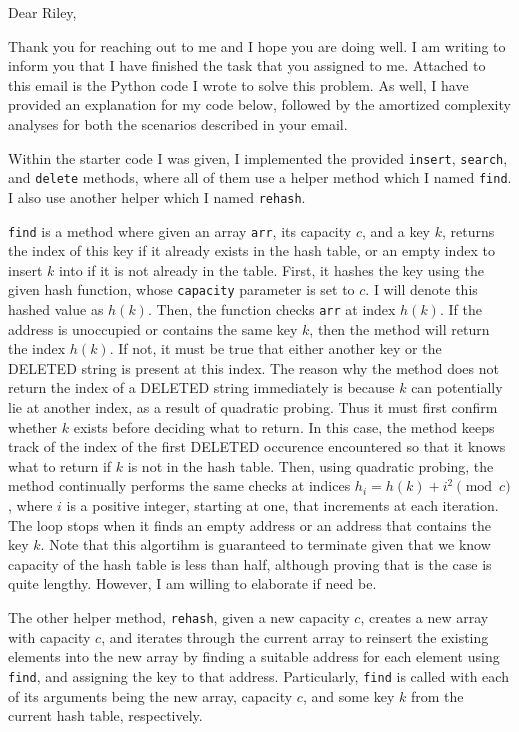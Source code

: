 \documentclass[11pt]{article}
\begin{document}
    Dear Riley,

    \medskip

    Thank you for reaching out to me and I hope you are doing well. I am writing to inform you that I have finished the task that you assigned to me. Attached to this email is the Python code I wrote to solve this problem. As well, I have provided an explanation for my code below, followed by the amortized complexity analyses for both the scenarios described in your email.

    Within the starter code I was given, I implemented the provided \texttt{insert}, \texttt{search}, and \texttt{delete} methods, where all of them use a helper method which I named \texttt{find}. I also use another helper which I named \texttt{rehash}.

    \texttt{find} is a method where given an array \texttt{arr}, its capacity \(c\), and a key \(k\), returns the index of this key if it already exists in the hash table, or an empty index to insert \(k\) into if it is not already in the table. First, it hashes the key using the given hash function, whose \texttt{capacity} parameter is set to \(c\). I will denote this hashed value as \(h(k)\). Then, the function checks \texttt{arr} at index \(h(k)\). If the address is unoccupied or contains the same key \(k\), then the method will return the index \(h(k)\). If not, it must be true that either another key or the DELETED string is present at this index. The reason why the method does not return the index of a DELETED string immediately is because \(k\) can potentially lie at another index, as a result of quadratic probing. Thus it must first confirm whether \(k\) exists before deciding what to return. In this case, the method keeps track of the index of the first  DELETED occurence encountered so that it knows what to return if \(k\) is not in the hash table. Then, using quadratic probing, the method continually performs the same checks at indices \(h_i = h(k) + i^2 \pmod c\), where \(i\) is a positive integer, starting at one, that increments at each iteration. The loop stops when it finds an empty address or an address that contains the key \(k\). Note that this algortihm is guaranteed to terminate given that we know capacity of the hash table is less than half, although proving that is the case is quite lengthy. However, I am willing to elaborate if need be.

    The other helper method, \texttt{rehash}, given a new capacity \(c\), creates a new array with capacity \(c\), and iterates through the current array to reinsert the existing elements into the new array by finding a suitable address for each element using \texttt{find}, and assigning the key to that address. Particularly, \texttt{find} is called with each of its arguments being the new array, capacity \(c\), and some key \(k\) from the current hash table, respectively.
\end{document}
